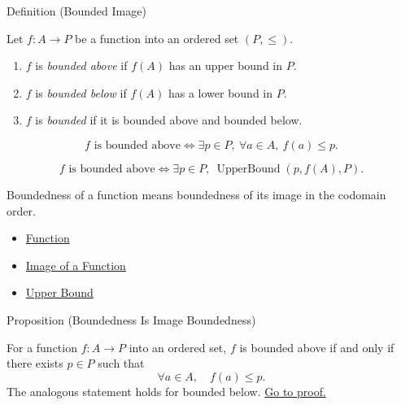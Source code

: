 \begin{definitionbox}{Definition (Bounded Image)}
\begin{definition}\label{def:bounded-image}
Let $f:A\to P$ be a function into an ordered set $(P,\leq)$.
\begin{enumerate}[label=(\roman*)]
\item $f$ is \emph{bounded above} if $f(A)$ has an upper bound in $P$.
\item $f$ is \emph{bounded below} if $f(A)$ has a lower bound in $P$.
\item $f$ is \emph{bounded} if it is bounded above and bounded below.
\end{enumerate}
\end{definition}
\end{definitionbox}

\begin{remark*}
\[
  f\text{ is bounded above}
  \iff
  \exists p\in P,\ \forall a\in A,\ f(a)\leq p.
\]
\end{remark*}

\begin{remark*}
\[
  f\text{ is bounded above}
  \iff
  \exists p\in P,\ \operatorname{UpperBound}(p,f(A),P).
\]
\end{remark*}

\begin{remark*}[Interpretation]
Boundedness of a function means boundedness of its image in the codomain order.
\end{remark*}

\begin{dependencies}
\begin{itemize}
  \item \hyperref[def:function]{Function}
  \item \hyperref[def:image-function]{Image of a Function}
  \item \hyperref[def:upper-bound]{Upper Bound}
\end{itemize}
\end{dependencies}

\begin{propositionbox}{Proposition (Boundedness Is Image Boundedness)}
\begin{proposition}\label{prop:boundedness-image-boundedness}
For a function $f:A\to P$ into an ordered set, $f$ is bounded above if and
only if there exists $p\in P$ such that
\[
\forall a\in A,\quad f(a)\leq p.
\]
The analogous statement holds for bounded below.
\hyperref[prf:boundedness-image-boundedness]{Go to proof.}
\end{proposition}
\end{propositionbox}

